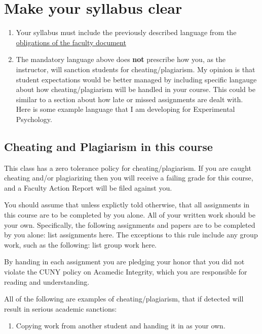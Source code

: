 \documentclass[]{book}
\providecommand{\tightlist}{%
  \setlength{\itemsep}{0pt}\setlength{\parskip}{0pt}}
\theoremstyle{definition}
\theoremstyle{definition}
\theoremstyle{definition}
\theoremstyle{remark}
\begin{document}
\section{Make your syllabus clear}\label{make-your-syllabus-clear}

\begin{enumerate}
\def\labelenumi{\arabic{enumi}.}
\item
  Your syllabus must include the previously described language from the
  \href{\%22Resources/F16_FacultyObligations_andSyllabus.pdf\%22}{obligations
  of the faculty document}
\item
  The mandatory language above does \textbf{not} prescribe how you, as
  the instructor, will sanction students for cheating/plagiarism. My
  opinion is that student expectations would be better managed by
  including specific langauge about how cheating/plagiarism will be
  handled in your course. This could be similar to a section about how
  late or missed assignments are dealt with. Here is some example
  language that I am developing for Experimental Psychology.
\end{enumerate}

\subsection{Cheating and Plagiarism in this
course}\label{cheating-and-plagiarism-in-this-course}

This class has a zero tolerance policy for cheating/plagiarism. If you
are caught cheating and/or plagiarizing then you will receive a failing
grade for this course, and a Faculty Action Report will be filed against
you.

You should assume that unless explictly told otherwise, that all
assignments in this course are to be completed by you alone. All of your
written work should be your own. Specifically, the following assignments
and papers are to be completed by you alone: list assignments here. The
exceptions to this rule include any group work, such as the following:
list group work here.

By handing in each assignment you are pledging your honor that you did
not violate the CUNY policy on Acamedic Integrity, which you are
responsible for reading and understanding.

All of the following are examples of cheating/plagiarism, that if
detected will result in serious academic sanctions:

\begin{enumerate}
\def\labelenumi{\arabic{enumi}.}
\tightlist
\item
  Copying work from another student and handing it in as your own.
\end{enumerate}
\end{document}
